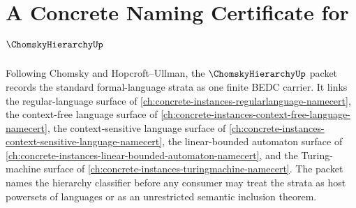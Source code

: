 \chapter{A Concrete Naming Certificate for $\ChomskyHierarchyUp$}
\label{ch:concrete-instances-chomsky-hierarchy-namecert}

Following Chomsky and Hopcroft--Ullman, the $\ChomskyHierarchyUp$ packet records the standard formal-language strata as one finite BEDC carrier. It links the regular-language surface of \autoref{ch:concrete-instances-regularlanguage-namecert}, the context-free language surface of \autoref{ch:concrete-instances-context-free-language-namecert}, the context-sensitive language surface of \autoref{ch:concrete-instances-context-sensitive-language-namecert}, the linear-bounded automaton surface of \autoref{ch:concrete-instances-linear-bounded-automaton-namecert}, and the Turing-machine surface of \autoref{ch:concrete-instances-turingmachine-namecert}. The packet names the hierarchy classifier before any consumer may treat the strata as host powersets of languages or as an unrestricted semantic inclusion theorem.

